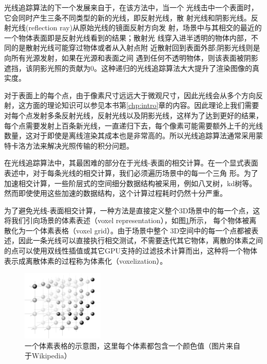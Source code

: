 光线追踪算法的下一个发展来自于\cite{a:Animprovedilluminationmodelforshadeddisplay}，在该方法中，当一个 光线击中一个表面时，它会同时产生三条不同类型的新的光线，即反射光线，散 射光线和阴影光线。反射光线(reflection ray)从原始光线的镜面反射方向发 射，场景中与其相交的最近的一个物体表面即是反射光线看到的结果；散射光 线穿入进半透明的物体内部，不同的是散射光线可能穿过物体或者从入射点附 近散射回到表面外部;阴影光线则是向所有光源发射，如果在光源和表面之间 遇到任何不透明物体，则该表面被阴影遮挡，该阴影光照的贡献为0。这种递归的光线追踪算法大大提升了渲染图像的真实度。

对于表面上的每个点，由于像素尺寸远远大于微观尺寸，因此光线会从多个方向反射，这方面的理论知识可以参见本书第\ref{chp:intro}章的内容。因此理论上我们需要对每个点发射多条反射光线，反射光线以及阴影光线，这样为了达到更好的结果，每个点需要发射上百条新光线，一直递归下去，每个像素可能需要额外上千的光线数量，这对于即使是离线渲染其成本也是非常高的。所以光线追踪算法通常采用蒙特卡洛方法来解决光照传输的积分问题。

在光线追踪算法中，其最困难的部分在于光线-表面的相交计算。在一个显式表面表述中，对于每条光线的相交计算，我们必须遍历场景中的每一个三角 形。为了加速相交计算，一些阶层式的空间细分数据结构被采用，例如八叉树，kd树等。然而即使使用这些加速的数据结构，这个计算过程耗时仍然十分严重。

为了避免光线-表面相交计算，一种方法是直接定义整个3D场景中的每一个点，这将我们引向场景的体素表述（voxel representation），如图\ref{f:df-Voxelgitter}所示， 每个物体被离散化为一个体素表格（voxel grid）。由于场景中整个 3D空间中的每一个点都被表述，因此一条光线可以直接执行相交测试，不需要迭代其它物体，离散的体素之间的点可以使用双线性插值或其它GPU支持的过滤技术计算而出，这种将一个物体表示成离散体素的过程称为体素化（voxelization）。

\begin{figure}
	\sidecaption
	\includegraphics[width=0.35\textwidth]{figures/df/Voxelgitter}
	\caption{一个体素表格的示意图，这里每个体素都包含一个颜色值（图片来自于Wikipedia）}
	\label{f:df-Voxelgitter}
\end{figure}

